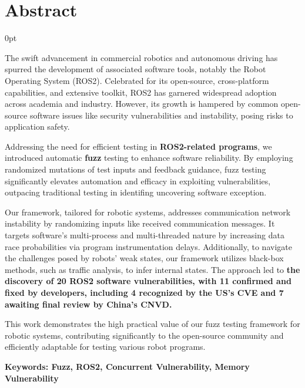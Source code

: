 \documentclass[zihao=-4]{ctexart}
\newcommand{\setParDis}{\setlength {\parskip} {0pt} }
\begin{document}
\section*{\textbf{Abstract}} %
\begin{spacing}{1.5}
\begin{adjustwidth}{0.42cm}{0.42cm}
  \setParDis %

The swift advancement in commercial robotics and autonomous driving has spurred
the development of associated software tools, notably the Robot Operating System
(ROS2). Celebrated for its open-source, cross-platform capabilities, and
extensive toolkit, ROS2 has garnered widespread adoption across academia and
industry. However, its growth is hampered by common open-source software issues
like security vulnerabilities and instability, posing risks to application
safety.

Addressing the need for efficient testing in \textbf{ROS2-related programs}, we
introduced automatic \textbf{fuzz} testing to enhance software reliability. By
employing randomized mutations of test inputs and feedback guidance, fuzz
testing significantly elevates automation and efficacy in exploiting
vulnerabilities, outpacing traditional testing in identifing uncovering software
exception.

Our framework, tailored for robotic systems, addresses communication network
instability by randomizing inputs like received communication messages. It
targets software's multi-process and multi-threaded nature by increasing data
race probabilities via program instrumentation delays. Additionally, to navigate
the challenges posed by robots' weak states, our framework utilizes black-box
methods, such as traffic analysis, to infer internal states. The approach led to
\textbf{the discovery of 20 ROS2 software vulnerabilities, with 11 confirmed and
fixed by developers, including 4 recognized by the US's CVE and 7 awaiting final
review by China's CNVD.}

This work demonstrates the high practical value of our fuzz testing framework
for robotic systems, contributing significantly to the open-source community and
efficiently adaptable for testing various robot programs.

\textbf{Keywords: Fuzz, ROS2, Concurrent Vulnerability, Memory Vulnerability}
\end{adjustwidth}
\end{spacing}
\end{document}
